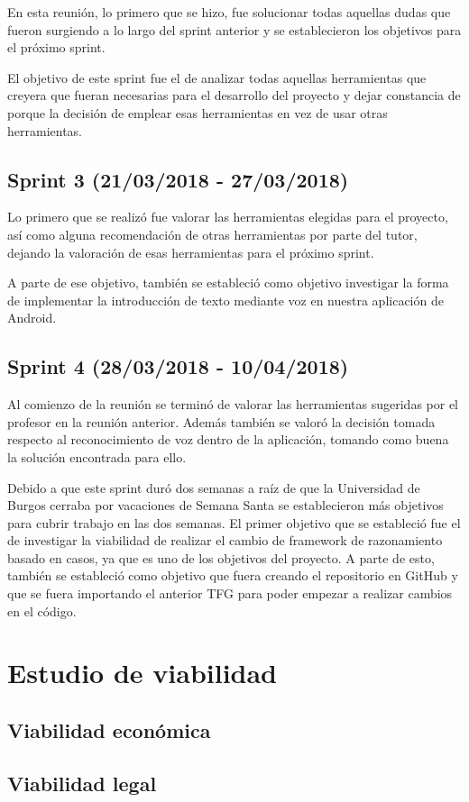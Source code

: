 En esta reunión, lo primero que se hizo, fue solucionar todas aquellas dudas que fueron surgiendo a lo largo del sprint anterior y se establecieron los objetivos para el próximo sprint.

El objetivo de este sprint fue el de analizar todas aquellas herramientas que creyera que fueran necesarias para el desarrollo del proyecto y dejar constancia de porque la decisión de emplear esas herramientas en vez de usar otras herramientas.

\subsection{Sprint 3 (21/03/2018 - 27/03/2018)}

Lo primero que se realizó fue valorar las herramientas elegidas para el proyecto, así como alguna recomendación de otras herramientas por parte del tutor, dejando la valoración de esas herramientas para el próximo sprint.

A parte de ese objetivo, también se estableció como objetivo investigar la forma de implementar la introducción de texto mediante voz en nuestra aplicación de Android.

\subsection{Sprint 4 (28/03/2018 - 10/04/2018)}

Al comienzo de la reunión se terminó de valorar las herramientas sugeridas por el profesor en la reunión anterior. Además también se valoró la decisión tomada respecto al reconocimiento de voz dentro de la aplicación, tomando como buena la solución encontrada para ello.

Debido a que este sprint duró dos semanas a raíz de que la Universidad de Burgos cerraba por vacaciones de Semana Santa se establecieron más objetivos para cubrir trabajo en las dos semanas. El primer objetivo que se estableció fue el de investigar la viabilidad de realizar el cambio de framework de razonamiento basado en casos, ya que es uno de los objetivos del proyecto. A parte de esto, también se estableció como objetivo que fuera 
creando el repositorio en GitHub y que se fuera importando el anterior TFG para poder empezar a realizar cambios en el código.






















\section{Estudio de viabilidad}

\subsection{Viabilidad económica}

\subsection{Viabilidad legal}


